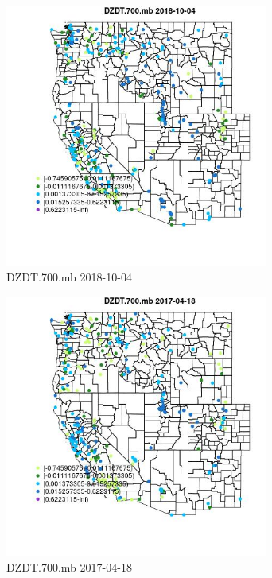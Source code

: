 \begin{figure} 
\centering  
\includegraphics[width=0.77\textwidth]{Code_Outputs/Report_ML_input_PM25_Step4_part_f_de_duplicated_aves_prioritize_24hr_obswNAs_MapObsDZDT700mb2018-10-04.jpg} 
\caption{\label{fig:Report_ML_input_PM25_Step4_part_f_de_duplicated_aves_prioritize_24hr_obswNAsMapObsDZDT700mb2018-10-04}DZDT.700.mb 2018-10-04} 
\end{figure} 
 

\begin{figure} 
\centering  
\includegraphics[width=0.77\textwidth]{Code_Outputs/Report_ML_input_PM25_Step4_part_f_de_duplicated_aves_prioritize_24hr_obswNAs_MapObsDZDT700mb2017-04-18.jpg} 
\caption{\label{fig:Report_ML_input_PM25_Step4_part_f_de_duplicated_aves_prioritize_24hr_obswNAsMapObsDZDT700mb2017-04-18}DZDT.700.mb 2017-04-18} 
\end{figure} 
 

